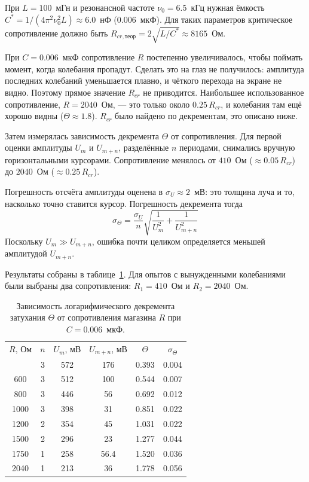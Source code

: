 \documentclass[reprint, amsmath, amssymb, aps, pra, nofootinbib]{revtex4-2}
\begin{document}
При $L = 100$~мГн и резонансной частоте $\nu_0 = 6.5$~кГц нужная ёмкость $C^* = 1 / (4\pi^2 \nu_0^2 L) \approx 6.0$~нФ ($0.006$~мкФ). Для таких параметров критическое сопротивление должно быть $R_{cr, \text{теор}} = 2\sqrt{L/C^*} \approx 8165$~Ом. 

При $C = 0.006$~мкФ сопротивление $R$ постепенно увеличивалось, чтобы поймать момент, когда колебания пропадут. Сделать это на глаз не получилось: амплитуда последних колебаний уменьшается плавно, и чёткого перехода на экране не видно. Поэтому прямое значение $R_{cr}$ не приводится. Наибольшее использованное сопротивление, $R = 2040$~Ом, — это только около $0.25\,R_{cr}$, и колебания там ещё хорошо видны ($\Theta\approx 1.8$). $R_{cr}$ было найдено по декрементам, это описано ниже.

Затем измерялась зависимость декремента $\Theta$ от сопротивления. Для первой оценки амплитуды $U_m$ и $U_{m+n}$, разделённые $n$ периодами, снимались вручную горизонтальными курсорами. Сопротивление менялось от $410$~Ом ($\approx 0.05\,R_{cr}$) до $2040$~Ом ($\approx 0.25\,R_{cr}$).

Погрешность отсчёта амплитуды оценена в $\sigma_U \approx 2$~мВ: это толщина луча и то, насколько точно ставится курсор. Погрешность декремента тогда
\begin{equation}
    \sigma_\Theta = \frac{\sigma_U}{n} \sqrt{ \frac{1}{U_m^2} + \frac{1}{U_{m+n}^2} }
\end{equation}
Поскольку $U_m \gg U_{m+n}$, ошибка почти целиком определяется меньшей амплитудой $U_{m+n}$.

Результаты собраны в таблице~\ref{tab:decrement}. Для опытов с вынужденными колебаниями были выбраны два сопротивления: $R_1 = 410$~Ом и $R_2 = 2040$~Ом.

\begin{table}[h!]
    \caption{Зависимость логарифмического декремента затухания $\Theta$ от сопротивления магазина $R$ при $C = 0.006$~мкФ.}
    \label{tab:decrement}
    \begin{ruledtabular}
        \begin{tabular}{cccccc}
            $R$, Ом & $n$ & $U_m$, мВ & $U_{m+n}$, мВ & $\Theta$ & $\sigma_\Theta$ \\
            \colrule
            410  & 3 & 572 & 176  & 0.393 & 0.004 \\
            600  & 3 & 512 & 100  & 0.544 & 0.007 \\
            800  & 3 & 446 & 56   & 0.692 & 0.012 \\
            1000 & 3 & 398 & 31   & 0.851 & 0.022 \\
            1200 & 2 & 354 & 45   & 1.031 & 0.022 \\
            1500 & 2 & 296 & 23   & 1.277 & 0.044 \\
            1750 & 1 & 258 & 56.4 & 1.520 & 0.036 \\
            2040 & 1 & 213 & 36   & 1.778 & 0.056 \\
        \end{tabular}
    \end{ruledtabular}
\end{table}
\end{document}
